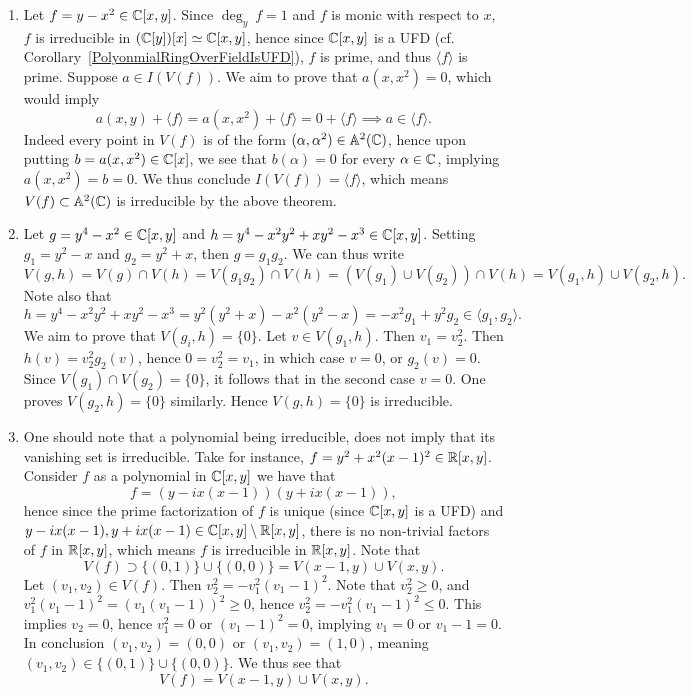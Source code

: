 \begin{example}
    \begin{enumerate}
        \item Let $f = y-x^2\in \mathbb{C}[x,y]$. Since $\deg_y\ f = 1$ and $f$ is monic with respect to $x$, $f$ is irreducible in $(\mathbb{C}[y])[x]\simeq \mathbb{C}[x,y]$, hence since $\mathbb{C}[x,y]$ is a UFD (cf. Corollary~\ref{PolyonmialRingOverFieldIsUFD}), $f$ is prime, and thus $\langle f\rangle$ is prime. Suppose $a\in I(V(f))$. We aim to prove that $a(x,x^2) = 0$, which would imply
        $$a(x,y) + \langle f\rangle = a(x,x^2) + \langle f \rangle =0 + \langle f \rangle \implies  a \in \langle f\rangle.$$
        Indeed every point in $V(f)$ is of the form $(\alpha,\alpha^2)\in \mathbb{A}^2(\mathbb{C})$, hence upon putting $b = a(x,x^2) \in \mathbb{C}[x]$, we see that $b(\alpha) = 0$ for every $\alpha\in\mathbb{C}  $, implying $a(x,x^2)=b=0$. We thus conclude $I(V(f))=\langle f\rangle$, which means $V(f)\subset \mathbb{A}^2(\mathbb{C})$ is irreducible by the above theorem. 
        \item Let $g = y^4 - x^2 \in \mathbb{C}[x,y]$ and $h = y^4 -x^2y^2+xy^2-x^3\in \mathbb{C}[x,y]$. Setting $g_1 = y^2-x$ and $g_2 = y^2+x$, then $g=g_1g_2$. We can thus write 
        $$V(g,h) = V(g)\cap V(h) = V(g_1g_2)\cap V(h)= (V(g_1)\cup V(g_2))\cap V(h) = V(g_1,h) \cup V(g_2,h).$$
        Note also that
        $$h=y^4 -x^2y^2+xy^2-x^3= y^2(y^2+x)-x^2(y^2-x) = -x^2g_1+y^2g_2\in \langle g_1,g_2\rangle.$$
        We aim to prove that $V(g_i,h)=\{0\}$. Let $v\in V(g_1,h).$ Then $v_1 = v_2^2$. Then $h(v) = v_2^2g_2(v)$, hence $0=v_2^2 = v_1$, in which case $v=0$, or $g_2(v)=0$. Since $V(g_1)\cap V(g_2) =\{0\}$, it follows that in the second case $v = 0$. One proves $V(g_2,h)=\{0\}$ similarly. Hence $V(g,h)=\{0\}$ is irreducible.
        \item One should note that a polynomial being irreducible, does not imply that its vanishing set is irreducible. Take for instance, $f = y^2 + x^2(x-1)^2\in \mathbb{R}[x,y]$. Consider $f$ as a polynomial in $\mathbb{C}[x,y]$ we have that 
        $$f  = (y-ix(x-1))(y+ix(x-1)),$$
        hence since the prime factorization of $f$ is unique (since $\mathbb{C}[x,y]$ is a UFD) and $y-ix(x-1),y+ix(x-1)\in \mathbb{C}[x,y]\setminus \mathbb{R}[x,y]$, there is no non-trivial factors of $f$ in $\mathbb{R}[x,y]$, which means $f$ is irreducible in $\mathbb{R}[x,y]$. Note that 
        $$V(f)\supset  \{(0,1)\}\cup\{(0,0)\} = V(x-1,y)\cup V(x,y).$$
        Let $(v_1,v_2)\in V(f)$. Then $v_2^2 = -v_1^2(v_1-1)^2$. Note that $v_2^2 \geq 0$, and $v_1^2(v_1-1)^2=(v_1(v_1-1))^2\geq 0$, hence $v_2^2=-v_1^2(v_1-1)^2\leq 0$. This implies $v_2 =0$, hence $v_1^2 = 0$ or $(v_1-1)^2 = 0$, implying $v_1=0$ or $v_1-1=0$. In conclusion $(v_1,v_2)=(0,0)$ or $(v_1,v_2)=(1,0)$, meaning $(v_1,v_2)\in \{(0,1)\}\cup \{(0,0)\}$. We thus see that 
        $$V(f) = V(x-1,y)\cup V(x,y).$$
        \end{enumerate}
\end{example}
